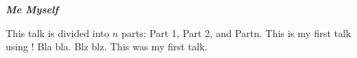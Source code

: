 \documentclass[landscape]{slides}
\begin{document}
 \vspace*{5cm}\centerline{{\large \bf \em Me Myself}}
	This talk is divided into $n$ parts: Part 1, Part 2, and Partn.
	This is my first talk using {\ActiveDVI}!
	Bla bla.
	Blz blz.
	This was my first talk.
\end{document}
